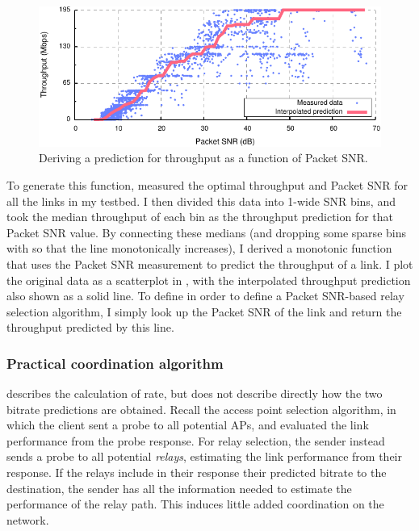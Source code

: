 \begin{figure}[t]
	\centering
	\includegraphics[width=\textwidth]{figures/applications/snr_vs_mbps.pdf}
	\caption[Deriving a prediction for throughput as a function of Packet SNR]{\label{fig:snr_vs_mbps}Deriving a prediction for throughput as a function of Packet SNR.}
\end{figure}

To generate this function, measured the optimal throughput and Packet SNR for all the links in my testbed. I then divided this data into 1\dB-wide SNR bins, and took the median throughput of each bin as the throughput prediction for that Packet SNR value. By connecting these medians (and dropping some sparse bins with so that the line monotonically increases), I derived a monotonic function that uses the Packet SNR measurement to predict the throughput of a link. I plot the original data as a scatterplot in , with the interpolated throughput prediction also shown as a solid line. To define  in order to define a Packet SNR-based relay selection algorithm, I simply look up the Packet SNR of the link and return the throughput predicted by this line.

\subsubsection{Practical coordination algorithm}
 describes the calculation of rate, but does not describe directly how the two bitrate predictions are obtained. Recall the access point selection algorithm, in which the client sent a probe to all potential APs, and evaluated the link performance from the probe response. For relay selection, the sender instead sends a probe to all potential \emph{relays}, estimating the link performance from their response. If the relays include in their response their predicted bitrate to the destination, the sender has all the information needed to estimate the performance of the relay path. This induces little added coordination on the network.

